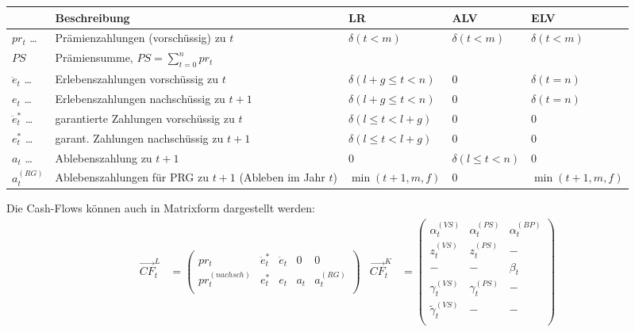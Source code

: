 \documentclass[a4paper,10pt]{article}
\begin{document}
\begin{longtable}{lp{6.5cm}v{2.5cm}v{2.5cm}v{2.5cm}}
& Beschreibung & LR & ALV & ELV \\\hline
$pr_t$  \dots          & Prämienzahlungen (vorschüssig) zu $t$ & $\delta(t<m)$ & $\delta(t<m)$ & $\delta(t<m)$ \\
$PS$                   & Prämiensumme, $PS=\sum_{t=0}^n pr_t$\\[1em]

$\ddot{e}_t$  \dots    & Erlebenszahlungen vorschüssig zu $t$ & $\delta(l+g\le t< n)$ & 0 & $\delta(t=n)$\\
$e_t$  \dots           & Erlebenszahlungen nachschüssig zu $t+1$& $\delta(l+g\le t< n)$ & 0 & $\delta(t=n)$\\
$\ddot{e}_t^{*}$ \dots & garantierte Zahlungen vorschüssig zu $t$ & $\delta(l\le t< l+g)$ & 0 & 0 \\
$e_t^{*}$  \dots       & garant. Zahlungen nachschüssig zu $t+1$ & $\delta(l\le t< l+g)$ & 0 & 0 \\[1em]

$a_t$  \dots           & Ablebenszahlung zu $t+1$ & 0 & $\delta(l\le t < n)$ & 0 \\
$a_t^{(RG)}$           & Ablebenszahlungen für PRG zu $t+1$ (Ableben im Jahr $t$) & $\min(t+1,m,f)$ & 0 & $\min(t+1,m,f)$ \\

\end{longtable}

Die Cash-Flows können auch in Matrixform dargestellt werden:
\begin{align*}
%
 \overrightarrow{CF}^L_t &= \left(
 \begin{matrix} %
pr_t & \ddot{e}_t^{*} & \ddot{e}_t & 0 & 0 \\
pr^{(nachsch)}_t & e_t^{*} & e_t & a_t & a_t^{(RG)}\\
\end{matrix}
 \right)
% 
&
 \overrightarrow{CF}^K_t &= \left(
 \begin{matrix}
\alpha^{(VS)}_t & \alpha^{(PS)}_t  & \alpha^{(BP)}_t \\
z^{(VS)}_t & z^{(PS)}_t  & -\\
- & - & \beta_t \\
\gamma^{(VS)}_t & \gamma^{(PS)}_t & -\\
\widetilde{\gamma}^{(VS)}_t & - & -\\  
 \end{matrix}
 \right)
\end{align*}
\end{document}
